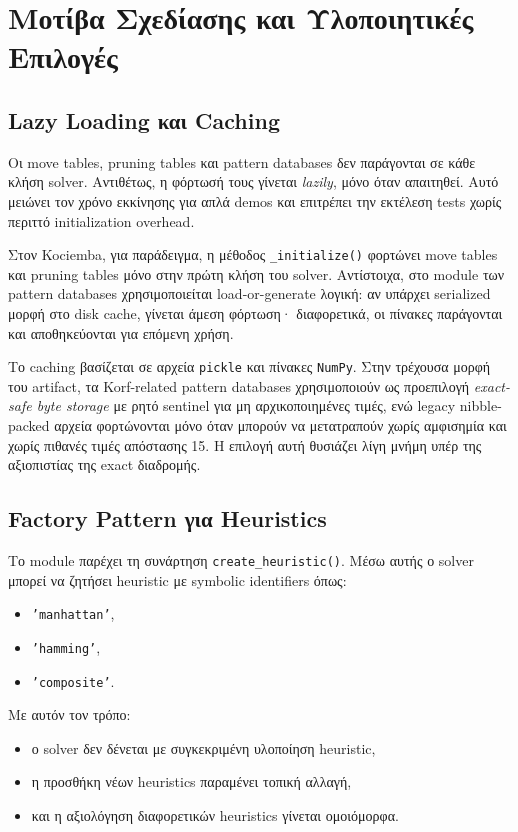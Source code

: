 \section{Μοτίβα Σχεδίασης και Υλοποιητικές Επιλογές}

\subsection{Lazy Loading και Caching}

Οι move tables, pruning tables και pattern databases δεν παράγονται σε κάθε κλήση solver. Αντιθέτως, η φόρτωσή τους γίνεται \emph{lazily}, μόνο όταν απαιτηθεί. Αυτό μειώνει τον χρόνο εκκίνησης για απλά demos και επιτρέπει την εκτέλεση tests χωρίς περιττό initialization overhead.

Στον Kociemba, για παράδειγμα, η μέθοδος \texttt{\_initialize()} φορτώνει move tables και pruning tables μόνο στην πρώτη κλήση του solver. Αντίστοιχα, στο module των pattern databases χρησιμοποιείται load-or-generate λογική: αν υπάρχει serialized μορφή στο disk cache, γίνεται άμεση φόρτωση· διαφορετικά, οι πίνακες παράγονται και αποθηκεύονται για επόμενη χρήση.

Το caching βασίζεται σε αρχεία \texttt{pickle} και πίνακες \texttt{NumPy}. Στην
τρέχουσα μορφή του artifact, τα Korf-related pattern databases χρησιμοποιούν
ως προεπιλογή \emph{exact-safe byte storage} με ρητό sentinel για μη
αρχικοποιημένες τιμές, ενώ legacy nibble-packed αρχεία φορτώνονται μόνο όταν
μπορούν να μετατραπούν χωρίς αμφισημία και χωρίς πιθανές τιμές απόστασης 15.
Η επιλογή αυτή θυσιάζει λίγη μνήμη υπέρ της αξιοπιστίας της exact διαδρομής.

\subsection{Factory Pattern για Heuristics}

Το module  παρέχει τη συνάρτηση
\texttt{create\_heuristic()}. Μέσω αυτής ο solver μπορεί να ζητήσει heuristic
με symbolic identifiers όπως:
\begin{itemize}
    \item \texttt{'manhattan'},
    \item \texttt{'hamming'},
    \item \texttt{'composite'}.
\end{itemize}
Με αυτόν τον τρόπο:
\begin{itemize}
    \item ο solver δεν δένεται με συγκεκριμένη υλοποίηση heuristic,
    \item η προσθήκη νέων heuristics παραμένει τοπική αλλαγή,
    \item και η αξιολόγηση διαφορετικών heuristics γίνεται ομοιόμορφα.
\end{itemize}

